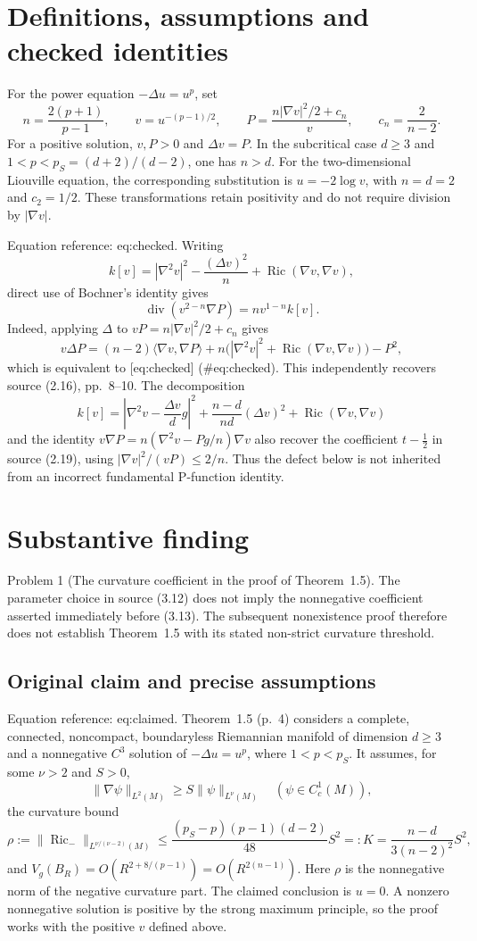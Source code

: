 \documentclass[10pt]{article}
\begin{document}
\section*{Definitions, assumptions and checked identities}
For the power equation \(-\Delta u=u^p\), set \[n=\frac{2(p+1)}{p-1},\qquad
 v=u^{-(p-1)/2},\qquad
 P=\frac{n|\nabla v|^2/2+c_n}{v},\qquad c_n=\frac{2}{n-2}.\] For a positive solution, \(v,P>0\) and \(\Delta v=P\). In the subcritical case \(d\ge3\) and \(1<p<p_S=(d+2)/(d-2)\), one has \(n>d\). For the two-dimensional Liouville equation, the corresponding substitution is \(u=-2\log v\), with \(n=d=2\) and \(c_2=1/2\). These transformations retain positivity and do not require division by \(|\nabla v|\).\par
Equation reference: eq:checked. Writing \[k[v]=|\nabla^2v|^2-\frac{(\Delta v)^2}{n}
       +\mathop{\mathrm{Ric}}(\nabla v,\nabla v),\] direct use of Bochner’s identity gives \[
 \mathop{\mathrm{div}}(v^{2-n}\nabla P)=n v^{1-n}k[v].\] Indeed, applying \(\Delta\) to \(vP=n|\nabla v|^2/2+c_n\) gives \[v\Delta P=(n-2)\langle\nabla v,\nabla P\rangle
       +n\bigl(|\nabla^2v|^2+\mathop{\mathrm{Ric}}(\nabla v,\nabla v)\bigr)-P^2,\] which is equivalent to [eq:checked] (\#eq:checked). This independently recovers source (2.16), pp. 8–10. The decomposition \[k[v]=\left|\nabla^2v-\frac{\Delta v}{d}g\right|^2
       +\frac{n-d}{nd}(\Delta v)^2+\mathop{\mathrm{Ric}}(\nabla v,\nabla v)\] and the identity \(v\nabla P=n(\nabla^2v-Pg/n)\nabla v\) also recover the coefficient \(t-\tfrac12\) in source (2.19), using \(|\nabla v|^2/(vP)\le2/n\). Thus the defect below is not inherited from an incorrect fundamental P-function identity.\par
\section*{Substantive finding}
Problem 1 (The curvature coefficient in the proof of Theorem 1.5).  The parameter choice in source (3.12) does not imply the nonnegative coefficient asserted immediately before (3.13). The subsequent nonexistence proof therefore does not establish Theorem 1.5 with its stated non-strict curvature threshold.\par
\subsection*{Original claim and precise assumptions}
Equation reference: eq:claimed. Theorem 1.5 (p. 4) considers a complete, connected, noncompact, boundaryless Riemannian manifold of dimension \(d\ge3\) and a nonnegative \(C^3\) solution of \(-\Delta u=u^p\), where \(1<p<p_S\). It assumes, for some \(\nu>2\) and \(S>0\), \[\|\nabla\psi\|_{L^2(M)}\ge S\|\psi\|_{L^\nu(M)}
 \quad(\psi\in C_c^1(M)),\] the curvature bound \[
 \rho:=\|\mathop{\mathrm{Ric}}_-\|_{L^{\nu/(\nu-2)}(M)}
 \le \frac{(p_S-p)(p-1)(d-2)}{48}S^2
 =:K=\frac{n-d}{3(n-2)^2}S^2,\] and \(V_g(B_R)=O(R^{2+8/(p-1)})=O(R^{2(n-1)})\). Here \(\rho\) is the nonnegative norm of the negative curvature part. The claimed conclusion is \(u=0\). A nonzero nonnegative solution is positive by the strong maximum principle, so the proof works with the positive \(v\) defined above.\par
\end{document}
